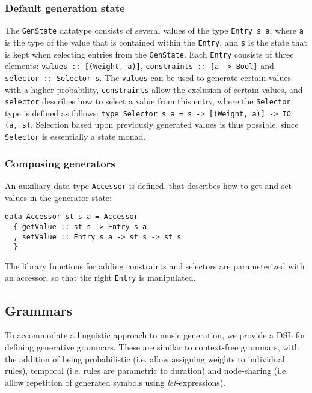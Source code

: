 \documentclass[11pt,a4paper]{article}
\newcommand{\icode}[1]{\texttt{#1}}
\begin{document}
\subsubsection{Default generation state}
The \icode{GenState} datatype consists of several values of the type \icode{Entry s a}, where \icode{a} is the type of the value that is contained within the \icode{Entry}, and \icode{s} is the state that is kept when selecting entries from the \icode{GenState}. Each \icode{Entry} consists of three elements: \icode{values :: [(Weight, a)]}, \icode{constraints :: [a -> Bool]} and \icode{selector :: Selector s}. The \icode{values} can be used to generate certain values with a higher probability, \icode{constraints} allow the exclusion of certain values, and \icode{selector} describes how to select a value from this entry, where the \icode{Selector} type is defined as follows: \icode{type Selector s a = s -> [(Weight, a)] -> IO (a, s)}. Selection based upon previously generated values is thus possible, since \icode{Selector} is essentially a state monad.

\subsubsection{Composing generators}
An auxiliary data type \icode{Accessor} is defined, that describes how to get and set values in the generator state:
\begin{verbatim}
data Accessor st s a = Accessor
  { getValue :: st s -> Entry s a
  , setValue :: Entry s a -> st s -> st s
  }
\end{verbatim}

The library functions for adding constraints and selectors are parameterized with an accessor, so that the right \icode{Entry} is manipulated.

\subsection{Grammars}
To accommodate a linguistic approach to music generation, we provide a DSL for defining generative grammars. These are similar to context-free grammars, with the addition of being probabilistic (i.e. allow assigning weights to individual rules), temporal (i.e. rules are parametric to duration) and node-sharing (i.e. allow repetition of generated symbols using \textit{let}-expressions).
\end{document}
